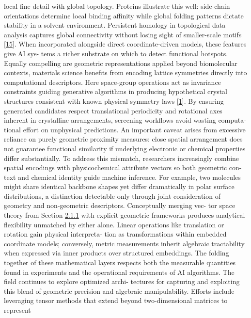 \documentclass[
]{article}
\begin{document}
local fine detail with global topology. Proteins illustrate this well:
side-chain orientations determine local binding affinity while global
folding patterns dictate stability in a solvent environment. Persistent
homology in topological data analysis captures global connectivity
without losing sight of smaller-scale motifs
{[}\protect\hyperlink{_bookmark55}{15}{]}. When incorporated alongside
direct coordinate-driven models, these features give AI sys- tems a
richer substrate on which to detect functional hotspots. Equally
compelling are geometric representations applied beyond biomolecular
contexts, materials science benefits from encoding lattice symmetries
directly into computational descriptors. Here space-group operations act
as invariance constraints guiding generative algorithms in producing
hypothetical crystal structures consistent with known physical symmetry
laws {[}\protect\hyperlink{_bookmark41}{1}{]}. By ensuring generated
candidates respect translational periodicity and rotational axes
inherent in crystalline arrangements, screening workflows avoid wasting
computa- tional effort on unphysical predictions. An important caveat
arises from excessive reliance on purely geometric proximity measures:
close spatial arrangement does not guarantee functional similarity if
underlying electronic or chemical properties differ substantially. To
address this mismatch, researchers increasingly combine spatial
encodings with physicochemical attribute vectors so both geometric con-
text and chemical identity guide machine inference. For example, two
molecules might share identical backbone shapes yet differ dramatically
in polar surface distributions, a distinction detectable only through
joint consideration of geometry and non-geometric descriptors.
Conceptually merging vec- tor space theory from Section
\protect\hyperlink{vector-spaces-and-linear-algebra}{2.1.1} with
explicit geometric frameworks produces analytical flexibility unmatched
by either alone. Linear operations like translation or rotation gain
physical interpreta- tion as transformations within embedded coordinate
models; conversely, metric measurements inherit algebraic tractability
when expressed via inner products over structured embeddings. The
folding together of these mathematical layers respects both the
measurable quantities found in experiments and the operational
requirements of AI algorithms. The field continues to explore optimized
archi- tectures for capturing and exploiting this blend of geometric
precision and algebraic manipulability. Efforts include leveraging
tensor methods that extend beyond two-dimensional matrices to represent
\end{document}
